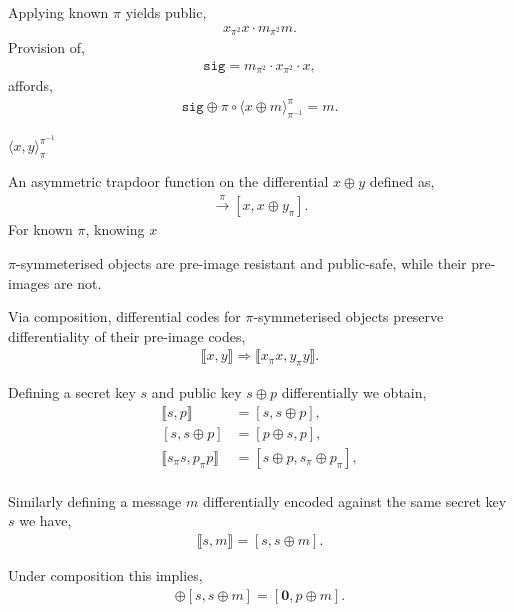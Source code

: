 \documentclass[twocolumn, aps, amsmath, amssymb, nofootinbib, superscriptaddress, longbibliography, doublefloatfix, table-of-contents, eqsecnum, rmp]{revtex4-2}
\def\diff#1#2{\llbracket #1,#2\rrbracket}
\def\braid#1#2#3#4{\langle#1,#2\rangle_{#3}^{#4}}
\def\selfbraid#1#2#3{\langle#1\rangle_{#2}^{#3}}
\begin{document}
Applying known $\pi$ yields public,
\begin{align}
	x_{\pi^2}x \cdot m_{\pi^2} m.
\end{align}
Provision of,
\begin{align}
	\mathtt{sig} = m_{\pi^2} \cdot x_{\pi^2} \cdot x,
\end{align}
affords,
\begin{align}
	\mathtt{sig} \oplus \pi \circ \selfbraid{x\oplus m}{\pi^{-1}}{\pi} = m.
\end{align}

$\braid{x}{y}{\pi}{\pi^{-1}}$


An asymmetric trapdoor function on the differential $x\oplus y$ defined as,
\begin{align}
	[x,x\oplus y] \xrightarrow{\pi} [x, x \oplus y_\pi].
\end{align}
For known $\pi$, knowing $x$

$\pi$-symmeterised objects are pre-image resistant and public-safe, while their pre-images are not.

Via composition, differential codes for $\pi$-symmeterised objects preserve differentiality of their pre-image codes,
\begin{align}
	\diff{x}{y} \Rightarrow \diff{x_\pi x}{y_\pi y}.
\end{align}

Defining a secret key $s$ and public key $s\oplus p$ differentially we obtain,
\begin{align}
	\diff{s}{p} &= [s, s\oplus p],\nonumber\\
	[s, s\oplus p] &= [p\oplus s, p],\nonumber\\
	\diff{s_\pi s}{p_\pi p} &= [s\oplus p, s_\pi\oplus p_\pi],\nonumber\\
\end{align}

Similarly defining a message $m$ differentially encoded against the same secret key $s$ we have,
\begin{align}
	\diff{s}{m} = [s,s\oplus m].
\end{align}

Under composition this implies,
\begin{align}
	[s,s\oplus p] \oplus [s,s\oplus m] = [\mathbf{0},p\oplus m].	
\end{align}
\end{document}
